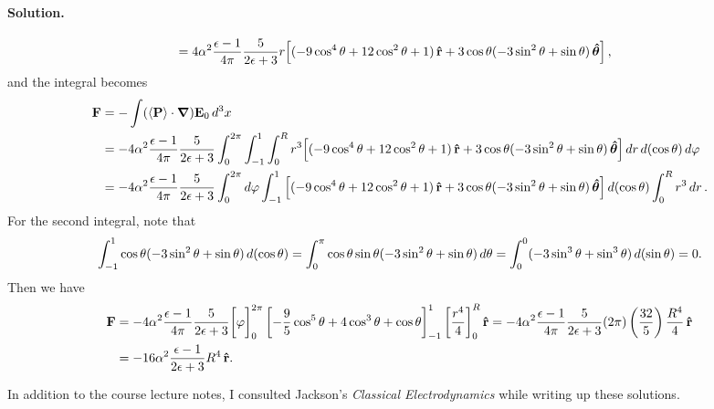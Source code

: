 \documentclass[11pt]{article}
\newcommand{\vfix}{\vspace{-\baselineskip}}
\newcommand{\beq}{\begin{equation*}}
\newcommand{\eeq}{\end{equation*}}
\newenvironment{solution}
{
    \paragraph{Solution.}
    \ignorespaces
}
{
    \bigskip
}
\begin{document}
\begin{solution}
\begin{align*}
		&= 4\alpha^2  \frac{\epsilon - 1}{4\pi} \frac{5}{2\epsilon + 3} r \!\left[ (-9\cos^4\theta + 12\cos^2\theta + 1) \,\vb{\hat{r}} + 3 \cos\theta (-3\sin^2\theta + \sin\theta) \,\boldsymbol{\hat{\theta}} \right],
	\end{align*}
	and the integral becomes
	\begin{align*}
		\vF &= -\int (\evP \cdot \grad) \vEo \dcx \\
		&= -4\alp^2  \frac{\eps - 1}{4\pi} \frac{5}{2\eps + 3} \intotp \intono \intoR r^3 \!\left[ (-9\cos^4\tht + 12\cos^2\tht + 1) \,\rh + 3 \cost (-3\sin^2\tht + \sint) \,\thh \right] \dr \dct \dph \\
		&= -4\alp^2 \frac{\eps - 1}{4\pi} \frac{5}{2\eps + 3} \intotp \dph \intono \left[ (-9\cos^4\tht + 12\cos^2\tht + 1) \,\rh + 3 \cost (-3\sin^2\tht + \sint) \,\thh \right] \dct \intoR r^3 \dr.
	\end{align*}
	For the second integral, note that
	\beq
		\intono \cost (-3\sin^2\tht + \sint) \dct
		= \int_0^\pi \cost \sint (-3\sin^2\tht + \sint) \dd{\tht}
		= \int_0^0 (-3\sin^3\tht + \sin^3\tht) \dd{(\sint)}
		= 0.
	\eeq
	Then we have
	\begin{align*}
		\vb{F} &= -4\alpha^2 \frac{\epsilon - 1}{4\pi} \frac{5}{2\epsilon + 3} \bigg[ \varphi \bigg]_0^{2\pi} \left[ -\frac{9}{5} \cos^5\theta + 4 \cos^3\theta + \cos\theta \right]_{-1}^1 \left[ \frac{r^4}{4} \right]_0^R \vb{\hat{r}}
		= -4\alpha^2 \frac{\epsilon - 1}{4\pi} \frac{5}{2\epsilon + 3} (2\pi) \left( \frac{32}{5} \right) \frac{R^4}{4} \,\vb{\hat{r}} \\
		&= -16 \alpha^2 \frac{\epsilon - 1}{2\epsilon + 3} R^4 \,\vb{\hat{r}}.
	\end{align*}
\end{solution}
\vfix



\vfill
In addition to the course lecture notes, I consulted Jackson's \emph{Classical Electrodynamics} while writing up these solutions.
\end{document}
